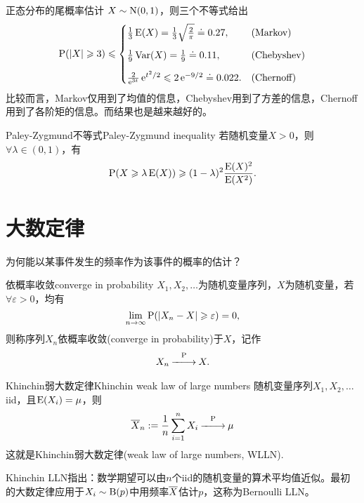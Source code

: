\begin{example}{正态分布的尾概率估计}{}
	$X\sim\Norm(0,1)$，则三个不等式给出
	\begin{align*}
		\P(|X|\geqslant 3)\leqslant\begin{cases}
			\frac13\E(X)=\frac13\sqrt{\frac2\pi}\doteq 0.27,&\text{(Markov)}\\[2ex]
			\frac19\Var(X)=\frac19\doteq 0.11,&\text{(Chebyshev)}\\[2ex]
			\frac{2}{\e{3t}}\e{t^2/2}\leqslant 2\e{-9/2}\doteq 0.022.&\text{(Chernoff)}
		\end{cases}
	\end{align*}
	比较而言，Markov仅用到了均值的信息，Chebyshev用到了方差的信息，Chernoff用到了各阶矩的信息。而结果也是越来越好的。
\end{example}

\begin{theorem}
	{Paley-Zygmund不等式}{Paley-Zygmund inequality}
	若随机变量$X>0$，则$\forall\lambda\in(0,1)$，有
	\begin{equation}
		\label{eq:Paley-Zygmund ineq}
		\P(X\geqslant\lambda\E(X))\geqslant(1-\lambda)^2\frac{\E(X)^2}{\E(X^2)}.
	\end{equation}
\end{theorem}

\section{大数定律}
为何能以某事件发生的频率作为该事件的概率的估计？
\begin{definition}{依概率收敛}{converge in probability}
	$X_1,X_2,\ldots$为随机变量序列，$X$为随机变量，若$\forall\varepsilon>0$，均有
	\[
		\lim_{n\to\infty}\P(|X_n-X|\geqslant\varepsilon)=0,
	\]
	则称序列$X_n$依概率收敛(converge in probability)于$X$，记作
	\begin{align}
		X_n\pto X.
	\end{align}
\end{definition}
\begin{theorem}{Khinchin弱大数定律}{Khinchin weak law of large numbers}
	随机变量序列$X_1,X_2,\ldots$ iid，且$\E(X_i)=\mu$，则
	\begin{align}
		\avg X_n:=\frac1n\sum_{i=1}^nX_i\pto\mu
	\end{align}
	这就是Khinchin弱大数定律(weak law of large numbers, WLLN).
\end{theorem}
Khinchin LLN指出：数学期望可以由$n$个iid的随机变量的算术平均值近似。最初的大数定律应用于$X_i\sim\Bern(p)$中用频率$\avg X$估计$p$，这称为Bernoulli LLN。

